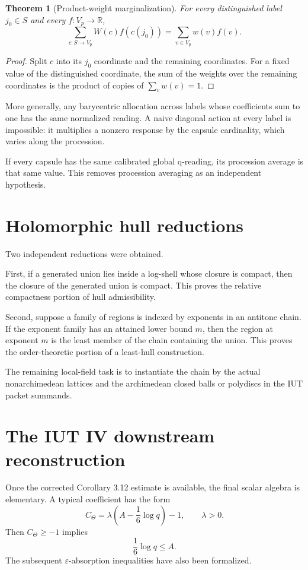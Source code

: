 \documentclass[11pt]{amsart}
\newtheorem{theorem}{Theorem}[section]
\theoremstyle{definition}
\theoremstyle{remark}
\newcommand{\R}{\mathbb R}
\newcommand{\eps}{\varepsilon}
\begin{document}
\begin{theorem}[Product-weight marginalization]\label{thm:marginal}
For every distinguished label $j_0\in S$ and every $f:V_p\to\R$,
\[
 \sum_{c:S\to V_p}W(c)f(c(j_0))
 =
 \sum_{v\in V_p}w(v)f(v).
\]
\end{theorem}

\begin{proof}
Split $c$ into its $j_0$ coordinate and the remaining coordinates.  For a
fixed value of the distinguished coordinate, the sum of the weights over the
remaining coordinates is the product of copies of $\sum_vw(v)=1$.
\end{proof}

More generally, any barycentric allocation across labels whose coefficients
sum to one has the same normalized reading.  A naive diagonal action at every
label is impossible: it multiplies a nonzero response by the capsule
cardinality, which varies along the procession.

If every capsule has the same calibrated global q-reading, its procession
average is that same value.  This removes procession averaging as an
independent hypothesis.

\section{Holomorphic hull reductions}

Two independent reductions were obtained.

First, if a generated union lies inside a log-shell whose closure is compact,
then the closure of the generated union is compact.  This proves the relative
compactness portion of hull admissibility.

Second, suppose a family of regions is indexed by exponents in an antitone
chain.  If the exponent family has an attained lower bound $m$, then the
region at exponent $m$ is the least member of the chain containing the union.
This proves the order-theoretic portion of a least-hull construction.

The remaining local-field task is to instantiate the chain by the actual
nonarchimedean lattices and the archimedean closed balls or polydiscs in the
IUT packet summands.

\section{The IUT IV downstream reconstruction}

Once the corrected Corollary 3.12 estimate is available, the final scalar
algebra is elementary.  A typical coefficient has the form
\[
 C_\Theta
 =\lambda\left(A-\frac16\log q\right)-1,
 \qquad \lambda>0.
\]
Then $C_\Theta\ge-1$ implies
\[
 \frac16\log q\le A.
\]
The subsequent $\eps$-absorption inequalities have also been formalized.
\end{document}
